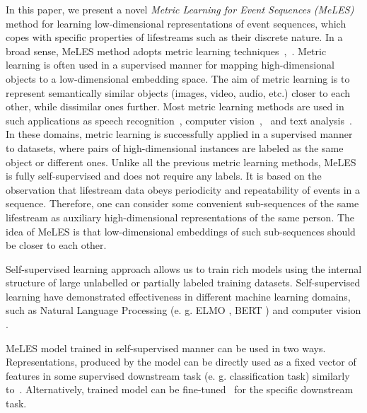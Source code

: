 \documentclass[sigconf, anonymous]{acmart}
\begin{document}
In this paper, we present a novel \emph{Metric Learning for Event Sequences (MeLES)} method for learning low-dimensional representations of event sequences, which copes with specific properties of lifestreams such as their discrete nature. In a broad sense, MeLES method adopts metric learning techniques~\cite{xing2003distance},~\cite{Hadsell:2006:DRL:1153171.1153654}. Metric learning is often used in a supervised manner for mapping high-dimensional objects to a low-dimensional embedding space. The aim of metric learning is to represent semantically similar objects (images, video, audio, etc.) closer to each other, while dissimilar ones further. Most metric learning methods are used in such applications as speech recognition~\cite{wan2017generalized}, computer vision~\cite{Schroff2015FaceNetAU},~\cite{Mao2019AdvRobust} and text analysis~\cite{reimers-2019-sentence-bert}. In these domains, metric learning is successfully applied in a supervised manner to datasets, where pairs of high-dimensional instances are labeled as the same object or different ones. 
Unlike all the previous metric learning methods, MeLES is fully self-supervised and does not require any labels. It is based on the observation that lifestream data obeys periodicity and repeatability of events in a sequence. Therefore, one can consider some convenient sub-sequences of the same lifestream as auxiliary high-dimensional representations of the same person. The idea of MeLES is that low-dimensional embeddings of such sub-sequences should be closer to each other.

Self-supervised learning approach allows us to train rich models using the internal structure of large unlabelled or partially labeled training datasets. Self-supervised learning have demonstrated effectiveness in different machine learning domains, such as Natural Language Processing (e. g. ELMO \cite{ELMO2018}, BERT \cite{Devlin2019BERTPO}) and computer vision \cite{doersch2015unsupervised}. %


MeLES model trained in self-supervised manner can be used in two ways. Representations, produced by the model can be directly used as a fixed vector of features in some supervised downstream task (e. g. classification task) similarly to~\cite{word2vec}. Alternatively, trained model can be fine-tuned~\cite{Devlin2019BERTPO} for the specific downstream task.
\end{document}
